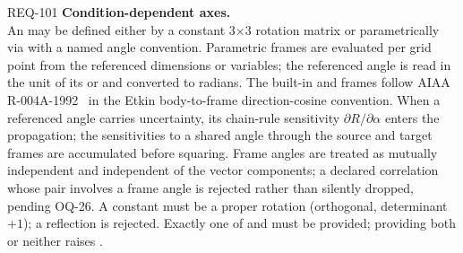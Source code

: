 \begin{reqbox}{REQ-101}{\stable}
\textbf{Condition-dependent axes.}\\
An  may be defined either by a constant 3$\times$3 rotation
matrix or parametrically via  with a
named angle convention. Parametric frames are evaluated per grid point
from the referenced dimensions or variables; the referenced angle is
read in the unit of its  or  and
converted to radians. The built-in  and 
frames follow AIAA R-004A-1992~\citep{aiaaR004A} in the Etkin
body-to-frame direction-cosine convention. When a referenced angle
carries uncertainty, its chain-rule sensitivity
$\partial R / \partial \alpha$ enters the propagation; the sensitivities
to a shared angle through the source and target frames are accumulated
before squaring. Frame angles are treated as mutually independent and
independent of the vector components; a declared correlation whose pair
involves a frame angle is rejected rather than silently dropped, pending
OQ-26. A constant  must be a proper rotation
(orthogonal, determinant $+1$); a reflection is rejected. Exactly one of
 and  must be provided;
providing both or neither raises .
\end{reqbox}

